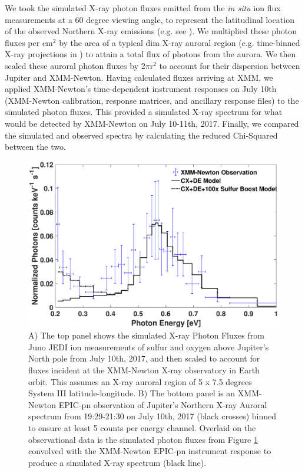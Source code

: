 \documentclass[draft]{agujournal2018}
\begin{document}
We took the simulated X-ray photon fluxes emitted from the \textit{in situ} ion flux measurements at a 60 degree viewing angle, to represent the latitudinal location of the observed Northern X-ray emissions (e.g. see \citet{gladstone2002,dunn2017}).
We multiplied these photon fluxes per cm$^2$ by the area of a typical dim X-ray auroral region (e.g. time-binned X-ray projections in \citet{dunn2016}) to attain a total flux of photons from the aurora.
We then scaled these auroral photon fluxes by 2$\pi$r$^2$ to account for their dispersion between Jupiter and XMM-Newton.
Having calculated fluxes arriving at XMM, we applied XMM-Newton’s time-dependent instrument responses on July 10th (XMM-Newton calibration, response matrices, and ancillary response files) to the simulated photon fluxes.
This provided a simulated X-ray spectrum for what would be detected by XMM-Newton on July 10-11th, 2017.
Finally, we compared the simulated and observed spectra by calculating the reduced Chi-Squared between the two.

\begin{figure}[ht]
    \centering
    \includegraphics[width=\textwidth]{Figures/XMMNewtonComparison.eps}
    \caption{A) The top panel shows the simulated X-ray Photon Fluxes from Juno JEDI ion measurements of sulfur and oxygen above Jupiter’s North pole from July 10th, 2017, and then scaled to account for fluxes incident at the XMM-Newton X-ray observatory in Earth orbit. This assumes an X-ray auroral region of 5 x 7.5 degrees System III latitude-longitude. B) The bottom panel is an XMM-Newton EPIC-pn observation of Jupiter’s Northern X-ray Auroral spectrum from 19:29-21:30 on July 10th, 2017 (black crosses) binned to ensure at least 5 counts per energy channel. Overlaid on the observational data is the simulated photon fluxes from Figure \ref{fig:XraySpectrumXMM} convolved with the XMM-Newton EPIC-pn instrument response to produce a simulated X-ray spectrum (black line).}
    \label{fig:XraySpectrumXMM}
\end{figure}
\end{document}
